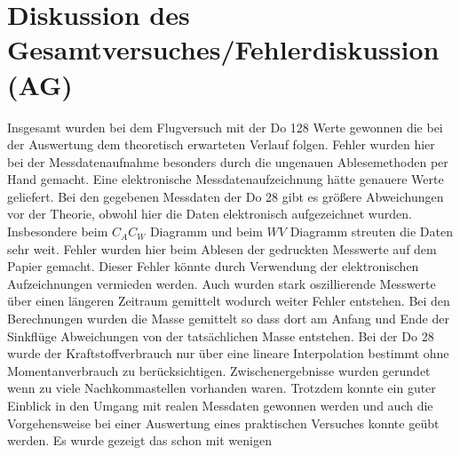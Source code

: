 \section{Diskussion des Gesamtversuches/Fehlerdiskussion (AG)}
Insgesamt wurden bei dem Flugversuch mit der Do 128 Werte gewonnen die bei der Auswertung dem theoretisch erwarteten Verlauf folgen. Fehler wurden hier bei der Messdatenaufnahme besonders durch die ungenauen Ablesemethoden per Hand gemacht. Eine elektronische Messdatenaufzeichnung hätte genauere Werte geliefert.
Bei den gegebenen Messdaten der Do 28 gibt es größere Abweichungen vor der Theorie, obwohl hier die Daten elektronisch aufgezeichnet wurden. Insbesondere beim $C_A C_W$ Diagramm und beim $W V$ Diagramm streuten die Daten sehr weit. Fehler wurden hier beim Ablesen der gedruckten Messwerte auf dem Papier gemacht. Dieser Fehler könnte durch Verwendung der elektronischen Aufzeichnungen vermieden werden. Auch wurden stark oszillierende Messwerte über einen längeren Zeitraum gemittelt wodurch weiter Fehler entstehen.
Bei den Berechnungen wurden die Masse gemittelt so dass dort am Anfang und Ende der Sinkflüge Abweichungen von der tatsächlichen Masse entstehen. Bei der Do 28 wurde der Kraftstoffverbrauch nur über eine lineare Interpolation bestimmt ohne Momentanverbrauch zu berücksichtigen. Zwischenergebnisse wurden gerundet wenn zu viele Nachkommastellen vorhanden waren.
Trotzdem konnte ein guter Einblick in den Umgang mit realen Messdaten gewonnen werden und auch die Vorgehensweise bei einer Auswertung eines praktischen Versuches konnte geübt werden. Es wurde gezeigt das schon mit wenigen 